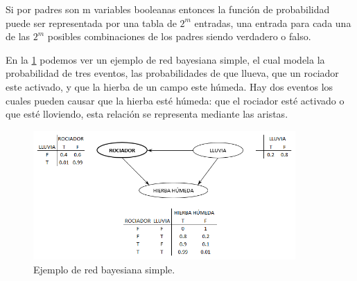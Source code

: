 Si por padres son m variables booleanas entonces la función de probabilidad puede ser representada por una tabla de $2^m$ entradas, una entrada para cada una de las $2^m$ posibles combinaciones de los padres siendo verdadero o falso.

En la \ref{fig:redBayesianaEjemplo} podemos ver un ejemplo de red bayesiana simple, el cual modela la probabilidad de tres eventos, las probabilidades de que llueva, que un rociador este activado, y que la hierba de un campo este húmeda. Hay dos eventos los cuales pueden causar que la hierba esté húmeda: que el rociador esté activado o que esté lloviendo, esta relación se representa mediante las aristas.

\begin{figure}[h!]
	\centering
	\includegraphics[width=10cm]{img/redBayesianaEjemplo.png}
	\caption{Ejemplo de red bayesiana simple.}
	\label{fig:redBayesianaEjemplo}
\end{figure}